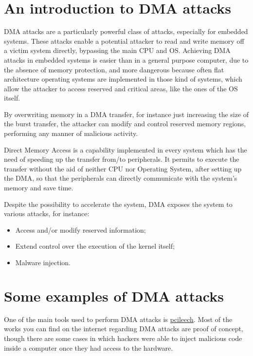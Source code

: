 \section{An introduction to DMA attacks} \label{intro}
DMA attacks are a particularly powerful class of attacks, especially for embedded systems. These attacks enable a potential attacker to read and write memory off a victim system directly, bypassing the main CPU and OS. Achieving DMA attacks in embedded systems is easier than in a general purpose computer, due to the absence of memory protection, and more dangerous because often flat architecture operating systems are implemented in those kind of systems, which allow the attacker to access reserved and critical areas, like the ones of the OS itself.

By overwriting memory in a DMA transfer, for instance just increasing the size of the burst transfer, the attacker can modify and control reserved memory regions, performing any manner of malicious activity.

Direct Memory Access is a capability implemented in every system which has the need of speeding up the transfer from/to peripherals. It permits to execute the transfer without the aid of neither CPU nor Operating System, after  setting up the DMA, so that the peripherals can directly communicate with the system's memory and save time.

Despite the possibility to accelerate the system, DMA exposes the system to various attacks, for instance:

\begin{itemize}
    \item Access and/or modify reserved information;
    \item Extend control over the execution of the kernel itself;
    \item Malware injection.
\end{itemize}



\section{Some examples of DMA attacks}
One of the main tools used to perform DMA attacks is \href{https://github.com/ufrisk/pcileech}{pcileech}. Most of the works you can find on the internet regarding DMA attacks are proof of concept, though there are some cases in which hackers were able to inject malicious code inside a computer once they had access to the hardware. 

